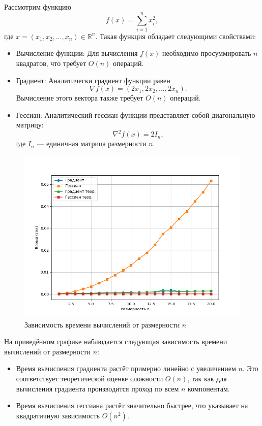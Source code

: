 \documentclass[a4paper,12pt]{article}
\begin{document}
Рассмотрим функцию
\[
f(x) = \sum_{i=1}^{n} x_i^2,
\]
где \(x = (x_1, x_2, \dots, x_n) \in \mathbb{R}^n\). Такая функция обладает следующими свойствами:
\begin{itemize}
    \item Вычисление функции: Для вычисления \(f(x)\) необходимо просуммировать \(n\) квадратов, что требует \(O(n)\) операций.
    \item Градиент: Аналитически градиент функции равен
    \[
    \nabla f(x) = (2x_1, 2x_2, \dots, 2x_n).
    \]
    Вычисление этого вектора также требует \(O(n)\) операций.
    \item Гессиан: Аналитический гессиан функции представляет собой диагональную матрицу:
    \[
    \nabla^2 f(x) = 2I_n,
    \]
    где \(I_n\) --- единичная матрица размерности \(n\).
\end{itemize}

\begin{figure}[H]
    \centering \includegraphics[width=\textwidth]{images/tick.png}
    \caption{Зависимость времени вычислений от размерности $n$}
\end{figure}
На приведённом графике наблюдается следующая зависимость времени вычислений от размерности \(n\):

\begin{itemize}
    \item Время вычисления градиента растёт примерно линейно с увеличением \(n\). Это соответствует теоретической оценке сложности \(O(n)\), так как для вычисления градиента производится проход по всем \(n\) компонентам.
    \item Время вычисления гессиана растёт значительно быстрее, что указывает на квадратичную зависимость \(O(n^2)\).
\end{itemize}
\end{document}

